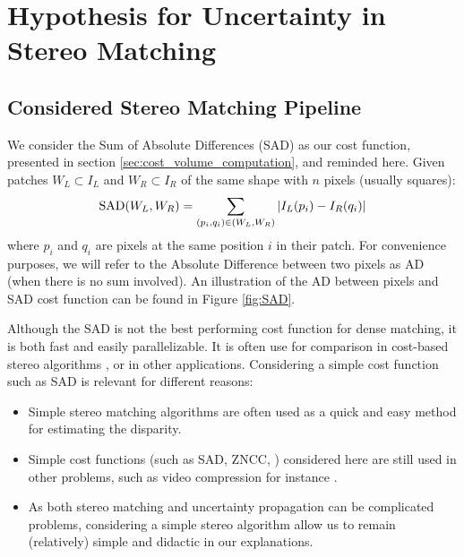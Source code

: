 \section{Hypothesis for Uncertainty in Stereo Matching}\label{sec:sources_of_uncertainty}

\subsection{Considered Stereo Matching Pipeline}
We consider the Sum of Absolute Differences (SAD) as our cost function, presented in section \ref{sec:cost_volume_computation}, and reminded here. Given patches $W_L\subset I_L$ and $W_R\subset I_R$ of the same shape with $n$ pixels (usually squares):
\begin{align}
    {\mathrm{SAD}}(W_L, W_R) = \sum_{(p_i, q_i)\in (W_L, W_R)}|I_L(p_i) - I_R(q_i)|\label{eq:SAD}
\end{align}
where $p_i$ and $q_i$ are pixels at the same position $i$ in their patch. For convenience purposes, we will refer to the Absolute Difference between two pixels as AD (when there is no sum involved). An illustration of the AD between pixels and SAD cost function can be found in Figure \ref{fig:SAD}.

\begin{remark}
    Although the SAD is not the best performing cost function for dense matching, it is both fast and easily parallelizable. It is often use for comparison in cost-based stereo algorithms \cite{hirschmuller_evaluation_2007, zbontar_stereo_2016}, or in other applications. Considering a simple cost function such as SAD is relevant for different reasons:
    \begin{itemize}
        \item Simple stereo matching algorithms are often used as a quick and easy method for estimating the disparity.
        \item Simple cost functions (such as SAD, ZNCC, \etc) considered here are still used in other problems, such as video compression for instance \cite{richardson_h264_2006}.
        \item As both stereo matching and uncertainty propagation can be complicated problems, considering a simple stereo algorithm allow us to remain (relatively) simple and didactic in our explanations. 
    \end{itemize}
\end{remark}

